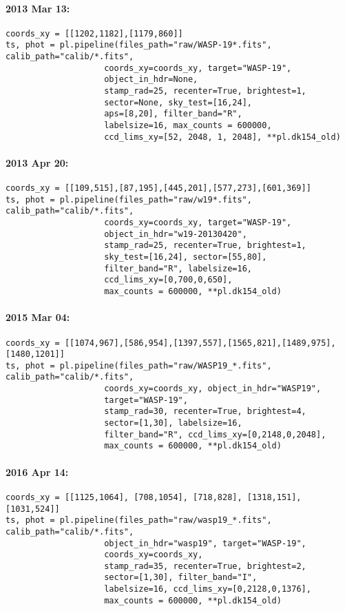 \paragraph*{2013 Mar 13:}
\begin{verbatim}
coords_xy = [[1202,1182],[1179,860]]
ts, phot = pl.pipeline(files_path="raw/WASP-19*.fits", calib_path="calib/*.fits",
                    coords_xy=coords_xy, target="WASP-19",
                    object_in_hdr=None,
                    stamp_rad=25, recenter=True, brightest=1,
                    sector=None, sky_test=[16,24],
                    aps=[8,20], filter_band="R",
                    labelsize=16, max_counts = 600000,
                    ccd_lims_xy=[52, 2048, 1, 2048], **pl.dk154_old)
\end{verbatim}
\paragraph*{2013 Apr 20:}
\begin{verbatim}
coords_xy = [[109,515],[87,195],[445,201],[577,273],[601,369]]
ts, phot = pl.pipeline(files_path="raw/w19*.fits", calib_path="calib/*.fits",
                    coords_xy=coords_xy, target="WASP-19",
                    object_in_hdr="w19-20130420",
                    stamp_rad=25, recenter=True, brightest=1,
                    sky_test=[16,24], sector=[55,80],
                    filter_band="R", labelsize=16,
                    ccd_lims_xy=[0,700,0,650],
                    max_counts = 600000, **pl.dk154_old)
\end{verbatim}
\paragraph*{2015 Mar 04:}
\begin{verbatim}
coords_xy = [[1074,967],[586,954],[1397,557],[1565,821],[1489,975],[1480,1201]]
ts, phot = pl.pipeline(files_path="raw/WASP19_*.fits", calib_path="calib/*.fits",
                    coords_xy=coords_xy, object_in_hdr="WASP19",
                    target="WASP-19",
                    stamp_rad=30, recenter=True, brightest=4,
                    sector=[1,30], labelsize=16,
                    filter_band="R", ccd_lims_xy=[0,2148,0,2048],
                    max_counts = 600000, **pl.dk154_old)
\end{verbatim}
\paragraph*{2016 Apr 14:}
\begin{verbatim}
coords_xy = [[1125,1064], [708,1054], [718,828], [1318,151], [1031,524]]
ts, phot = pl.pipeline(files_path="raw/wasp19_*.fits", calib_path="calib/*.fits",
                    object_in_hdr="wasp19", target="WASP-19",
                    coords_xy=coords_xy,
                    stamp_rad=35, recenter=True, brightest=2,
                    sector=[1,30], filter_band="I",
                    labelsize=16, ccd_lims_xy=[0,2128,0,1376],
                    max_counts = 600000, **pl.dk154_old)
\end{verbatim}
